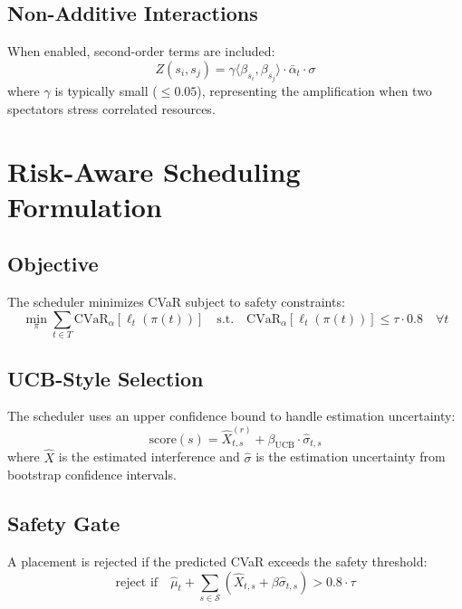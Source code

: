 \documentclass[11pt,twocolumn]{article}
\begin{document}
\subsection{Non-Additive Interactions}

When enabled, second-order terms are included:
\begin{equation}
Z(s_i, s_j) = \gamma \langle \beta_{s_i}, \beta_{s_j} \rangle \cdot \bar{\alpha}_t \cdot \sigma
\end{equation}
where $\gamma$ is typically small ($\leq 0.05$), representing the
amplification when two spectators stress correlated resources.

\section{Risk-Aware Scheduling Formulation}

\subsection{Objective}

The scheduler minimizes CVaR subject to safety constraints:
\begin{equation}
\min_{\pi} \sum_{t \in T} \text{CVaR}_\alpha\left[\ell_t(\pi(t))\right]
\quad \text{s.t.} \quad
\text{CVaR}_\alpha[\ell_t(\pi(t))] \leq \tau \cdot 0.8 \quad \forall t
\end{equation}

\subsection{UCB-Style Selection}

The scheduler uses an upper confidence bound to handle estimation uncertainty:
\begin{equation}
\text{score}(s) = \hat{X}_{t,s}^{(r)} + \beta_{\text{UCB}} \cdot \hat{\sigma}_{t,s}
\end{equation}
where $\hat{X}$ is the estimated interference and $\hat{\sigma}$ is
the estimation uncertainty from bootstrap confidence intervals.

\subsection{Safety Gate}

A placement is rejected if the predicted CVaR exceeds the safety threshold:
\begin{equation}
\text{reject if} \quad \hat{\mu}_t + \sum_{s \in \mathcal{S}} (\hat{X}_{t,s} + \beta \hat{\sigma}_{t,s}) > 0.8 \cdot \tau
\end{equation}
\end{document}
